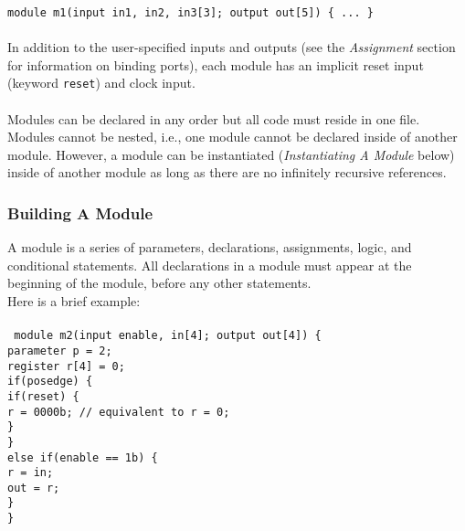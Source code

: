 \documentclass[letterpaper,11pt]{article}
\newcommand{\tab}{\hspace*{2em}}
\begin{document}
        \texttt{module m1(input in1, in2, in3[3]; output out[5]) \{ ... \} }\\\\
        In addition to the user-specified inputs and outputs (see the \emph{Assignment} section for
        information on binding ports), each module has an implicit reset input (keyword \texttt{reset})
        and clock input.\\\\
        
        Modules can be declared in any order but all code must reside in one file.  Modules cannot be 
        nested, i.e., one module cannot be declared inside of another module.  However, a module can be 
        instantiated (\emph{Instantiating A Module} below) inside of another module as long as there are 
        no infinitely recursive references.
        
        
        \subsubsection{Building A Module}
        A module is a series of parameters, declarations, assignments, logic, and conditional statements. 
        All declarations in a module must appear at the beginning of the module, before any other statements.\\
        Here is a brief example:\\\\
        \texttt{
        module m2(input enable, in[4]; output out[4]) \{ \\
        \tab parameter p = 2;\\
        \tab register r[4] = 0; \\
        \tab if(posedge) \{ \\
        \tab\tab if(reset) \{ \\
        \tab\tab\tab r = 0000b; // equivalent to r = 0; \\
        \tab\tab \} \\
        \tab \} \\
        \tab else if(enable == 1b) \{ \\
        \tab\tab r = in; \\
        \tab\tab out = r; \\
        \tab\} \\
        \}}
        
\end{document}
